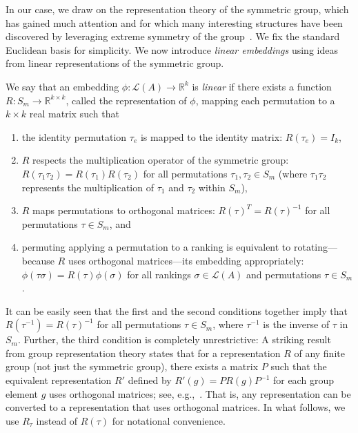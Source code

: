 \documentclass[prodmode]{acmsmall-ec14}
\newcommand{\calL}{{\mathcal{L}}}
\newcommand{\rank}{{\calL(A)}}
\begin{document}
In our case, we draw on the representation theory of the symmetric group, which has gained much attention and for which many interesting structures have been discovered by leveraging extreme symmetry of the group~\cite{JKCR84}. We fix the standard Euclidean basis for simplicity. We now introduce \emph{linear embeddings} using ideas from linear representations of the symmetric group. 


\begin{definition}
We say that an embedding $\phi:\rank \rightarrow \mathbb{R}^k$ is \emph{linear} if there exists a function $R : S_m \rightarrow \mathbb{R}^{k \times k}$, called the representation of $\phi$, mapping each permutation to a $k \times k$ real matrix such that 
\begin{enumerate}
\item the identity permutation $\tau_e$ is mapped to the identity matrix: $R(\tau_e) = I_k$,
\item $R$ respects the multiplication operator of the symmetric group: $R(\tau_1 \tau_2) = R(\tau_1) R(\tau_2)$ for all permutations $\tau_1,\tau_2 \in S_m$ (where $\tau_1 \tau_2$ represents the multiplication of $\tau_1$ and $\tau_2$ within $S_m$), 
\item $R$ maps permutations to orthogonal matrices: $R(\tau)^T = R(\tau)^{-1}$ for all permutations $\tau \in S_m$, and
\item permuting applying a permutation to a ranking is equivalent to rotating---because $R$ uses orthogonal matrices---its embedding appropriately: $\phi(\tau \sigma) = R(\tau) \phi(\sigma)$ for all rankings $\sigma \in \rank$ and permutations $\tau \in S_m$.
\end{enumerate}
\end{definition}

\noindent
It can be easily seen that the first and the second conditions together imply that $R(\tau^{-1}) = R(\tau)^{-1}$ for all permutations $\tau \in S_m$, where $\tau^{-1}$ is the inverse of $\tau$ in $S_m$. Further, the third condition is completely unrestrictive: A striking result from group representation theory states that for a representation $R$ of any finite group (not just the symmetric group), there exists a matrix $P$ such that the equivalent representation $R'$ defined by $R'(g) = P R(g) P^{-1}$ for each group element $g$ uses orthogonal matrices; see, e.g.,~\cite[Thm~6.3]{BMWM63}. That is, any representation can be converted to a representation that uses orthogonal matrices. In what follows, we use $R_{\tau}$ instead of $R(\tau)$ for notational convenience. 
\end{document}
